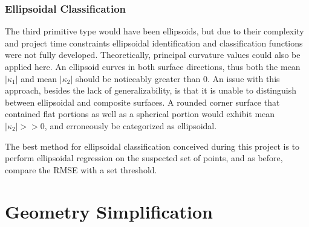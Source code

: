 \subsubsection{Ellipsoidal Classification}
The third primitive type would have been ellipsoids, but due to their complexity and project time constraints ellipsoidal identification and classification functions were not fully developed.
Theoretically, principal curvature values could also be applied here.
An ellipsoid curves in both surface directions, thus both the mean $|\kappa_1|$ and mean $|\kappa_2|$ should be noticeably greater than 0.
An issue with this approach, besides the lack of generalizability, is that it is unable to distinguish between ellipsoidal and composite surfaces.
A rounded corner surface that contained flat portions as well as a spherical portion would exhibit mean $|\kappa_2| >> 0$, and erroneously be categorized as ellipsoidal.

The best method for ellipsoidal classification conceived during this project is to perform ellipsoidal regression on the suspected set of points, and as before, compare the RMSE with a set threshold.

\section{Geometry Simplification}

